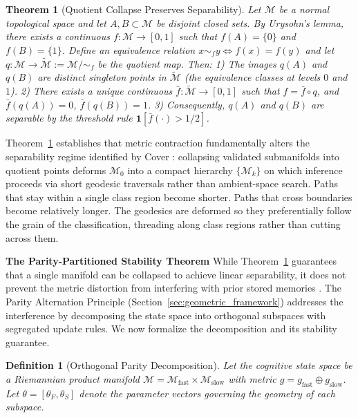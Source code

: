 \documentclass{article}
\newtheorem{theorem}{Theorem}
\newtheorem{definition}{Definition}
\begin{document}
\begin{theorem}[Quotient Collapse Preserves Separability]
\label{thm:topological_collapse}
Let $\mathcal{M}$ be a normal topological space and let $A,B\subset \mathcal{M}$ be disjoint closed sets.
By Urysohn’s lemma, there exists a continuous $f:\mathcal{M}\to[0,1]$ such that $f(A)=\{0\}$ and $f(B)=\{1\}$.
Define an equivalence relation $x\sim_f y \iff f(x)=f(y)$ and let $q:\mathcal{M}\to\tilde{\mathcal{M}}:=\mathcal{M}/\!\sim_f$ be the quotient map.
Then:
1) The images $q(A)$ and $q(B)$ are distinct singleton points in $\tilde{\mathcal{M}}$ (the equivalence classes at levels $0$ and $1$).
2) There exists a unique continuous $\bar f:\tilde{\mathcal{M}}\to[0,1]$ such that $f=\bar f\circ q$, and $\bar f(q(A))=0$, $\bar f(q(B))=1$.
3) Consequently, $q(A)$ and $q(B)$ are separable by the threshold rule $\mathbf{1}[\bar f(\cdot) > 1/2]$.
\end{theorem}
 
Theorem~\ref{thm:topological_collapse} establishes that metric contraction fundamentally alters the separability regime identified by Cover \cite{cover1965geometry}: collapsing validated submanifolds into quotient points deforms $\mathcal{M}_0$ into a compact hierarchy $\{\mathcal{M}_k\}$ on which inference proceeds via short geodesic traversals rather than ambient-space search. Paths that stay within a single class region become shorter. Paths that cross boundaries become relatively longer. The geodesics are deformed so they preferentially follow the grain of the classification, threading along class regions rather than cutting across them.
 

 
 
\noindent\textbf{The Parity-Partitioned Stability Theorem}
While Theorem~\ref{thm:topological_collapse} guarantees that a single manifold can be collapsed to achieve linear separability, it does not prevent the metric distortion from interfering with prior stored memories \cite{french1999catastrophic}. The Parity Alternation Principle (Section~\ref{sec:geometric_framework}) addresses the interference by decomposing the state space into orthogonal subspaces with segregated update rules. We now formalize the decomposition and its stability guarantee.
 
\begin{definition}[Orthogonal Parity Decomposition]
Let the cognitive state space be a Riemannian product manifold $\mathcal{M} = \mathcal{M}_{\text{fast}} \times \mathcal{M}_{\text{slow}}$ with metric $g = g_{\text{fast}} \oplus g_{\text{slow}}$.
Let $\theta = [\theta_F, \theta_S]$ denote the parameter vectors governing the geometry of each subspace.
\end{definition}
 
\end{document}
